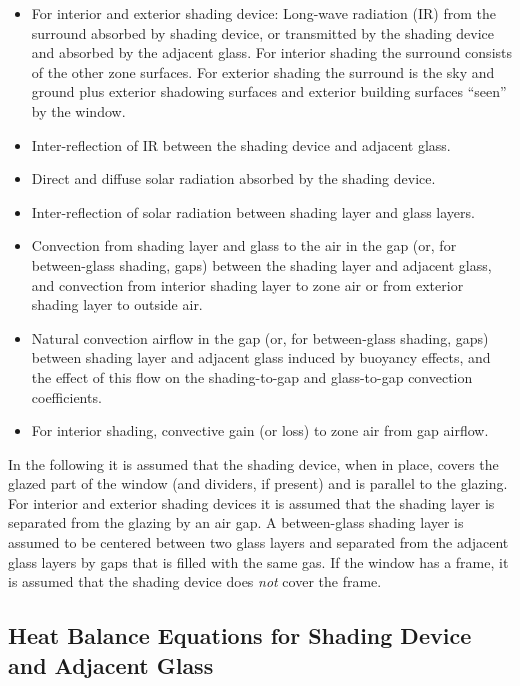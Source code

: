 \begin{itemize}
\item
  For interior and exterior shading device: Long-wave radiation (IR) from the surround absorbed by shading device, or transmitted by the shading device and absorbed by the adjacent glass. For interior shading the surround consists of the other zone surfaces. For exterior shading the surround is the sky and ground plus exterior shadowing surfaces and exterior building surfaces ``seen'' by the window.
\item
  Inter-reflection of IR between the shading device and adjacent glass.
\item
  Direct and diffuse solar radiation absorbed by the shading device.
\item
  Inter-reflection of solar radiation between shading layer and glass layers.
\item
  Convection from shading layer and glass to the air in the gap (or, for between-glass shading, gaps) between the shading layer and adjacent glass, and convection from interior shading layer to zone air or from exterior shading layer to outside air.
\item
  Natural convection airflow in the gap (or, for between-glass shading, gaps) between shading layer and adjacent glass induced by buoyancy effects, and the effect of this flow on the shading-to-gap and glass-to-gap convection coefficients.
\item
  For interior shading, convective gain (or loss) to zone air from gap airflow.
\end{itemize}

In the following it is assumed that the shading device, when in place, covers the glazed part of the window (and dividers, if present) and is parallel to the glazing. For interior and exterior shading devices it is assumed that the shading layer is separated from the glazing by an air gap. A between-glass shading layer is assumed to be centered between two glass layers and separated from the adjacent glass layers by gaps that is filled with the same gas. If the window has a frame, it is assumed that the shading device does \emph{not} cover the frame.

\subsection{Heat Balance Equations for Shading Device and Adjacent Glass}\label{heat-balance-equations-for-shading-device-and-adjacent-glass}

